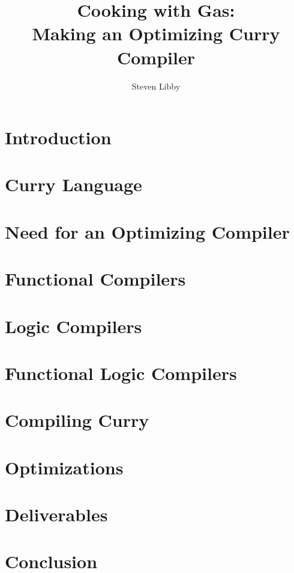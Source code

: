 \documentclass{article}
\title{Cooking with Gas:\\Making an Optimizing Curry Compiler}
\author{Steven Libby}
\begin{document}
\maketitle

\begin{abstract}
    
\end{abstract}

\section{Introduction}


\section{Curry Language}


\section{Need for an Optimizing Compiler}


\section{Functional Compilers}


\section{Logic Compilers}


\section{Functional Logic Compilers}


\section{Compiling Curry}


\section{Optimizations}


\section{Deliverables}


\section{Conclusion}





\end{document}
